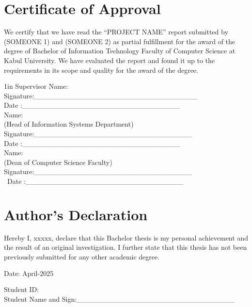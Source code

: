 

\section{Certificate of Approval}
We certify that we have read the “PROJECT NAME” report
submitted by (SOMEONE 1) and (SOMEONE 2) as partial fulfillment
for the award of the degree of Bachelor of Information Technology
Faculty of Computer Science at Kabul University. We have evaluated
the report and found it up to the requirements in its scope and quality
for the award of the degree.\\

\begin{adjustwidth}{1in}{}
	\Large
	Supervisor Name: \\
	Signature:\_\_\_\_\_\_\_\_\_\_\_\_\_\_\_\_\_\_\_\_\_\_\_\_\_\_\_\_\_\_\_\_ \\
	Date :\_\_\_\_\_\_\_\_\_\_\_\_\_\_\_\_\_\_\_\_\_\_\_\_\_\_\_\_\_\_\_\\ 
	
	
	Name: \\
	(Head of Information Systems Department) \\
	Signature:\_\_\_\_\_\_\_\_\_\_\_\_\_\_\_\_\_\_\_\_\_\_\_\_\_\_\_\_\_\_\_\\
	Date :\_\_\_\_\_\_\_\_\_\_\_\_\_\_\_\_\_\_\_\_\_\_\_\_\_\_\_\_\_\_\_\\ 
	
	
	Name: \\
	(Dean of Computer Science Faculty) \\
	Signature:\_\_\_\_\_\_\_\_\_\_\_\_\_\_\_\_\_\_\_\_\_\_\_\_\_\_\_\_\_\_\_\\\
	Date :\_\_\_\_\_\_\_\_\_\_\_\_\_\_\_\_\_\_\_\_\_\_\_\_\_\_\_\_\_\_\_
	
	
\end{adjustwidth}


\clearpage
\pagestyle{plain}
\newpage
\null
\newpage

\section{Author's Declaration}
Hereby I, xxxxx, declare that this Bachelor thesis is my personal
achievement and the result of an original investigation. I further state
that this thesis has not been previously submitted for any other
academic degree.\\


\begin{center}
	\text Date: April-2025
\end{center}

\vspace{30 pt}

\begin{flushleft}
Student ID: \\
Student Name and Sign:\_\_\_\_\_\_\_\_\_\_\_\_\_\_\_\_\_\_\_\_\_\_\_\_\_\_\_\_\_\_\_\	
\end{flushleft}
